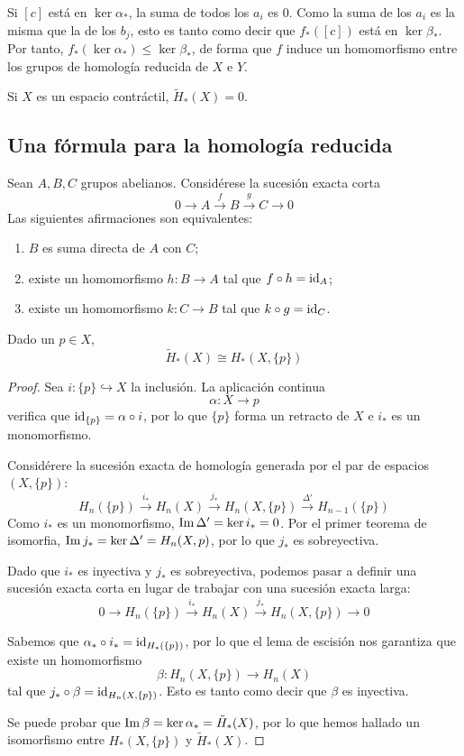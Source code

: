 Si $[c]$ está en $\ker \alpha_*$, la suma de todos los $a_i$ es 0. Como la
suma de los $a_i$ es la misma que la de los $b_j$, esto es tanto como decir
que $f_*([c])$ está en $\ker \beta_*$. Por tanto, $f_*(\ker \alpha_*) \leq
\ker \beta_*$, de forma que $f$ induce un homomorfismo entre los grupos de
homología reducida de $X$ e $Y$.

\begin{example}
Si $X$ es un espacio contráctil, $\tilde{H}_*(X)=0$.
\end{example}

\subsection{Una fórmula para la homología reducida}
\begin{lemma}
Sean $A,B,C$ grupos abelianos. Considérese la sucesión exacta corta
\[0 \longrightarrow A \xrightarrow{f} B \xrightarrow{g} C \longrightarrow 0\]
Las siguientes afirmaciones son equivalentes:
\begin{enumerate}
\item $B$ es suma directa de $A$ con $C$;
\item existe un homomorfismo $h\colon B \to A$ tal que $f\circ h=\operatorname{id}_A$;
\item existe un homomorfismo $k\colon C \to B$ tal que $k\circ g=\operatorname{id}_C$.
\end{enumerate}
\end{lemma}

\begin{proposition}
Dado un $p \in X$,
\[\tilde{H}_*(X)\cong H_*(X,\{p\})\]
\end{proposition}

\begin{proof}
Sea $i\colon \{p\} \hookrightarrow X$ la inclusión. La aplicación continua
\[\alpha: X \longrightarrow {p}\]
verifica que $\operatorname{id}_{\{p\}}=\alpha\circ i$, por lo que $\{p\}$ forma un
retracto de $X$ e $i_*$ es un monomorfismo.

Considérere la sucesión exacta de homología generada por el par de espacios
$(X,\{p\})$:
\[H_n(\{p\}) \xrightarrow{i_*} H_n(X) \xrightarrow{j_*}
H_n(X,\{p\}) \xrightarrow{\Delta'} H_{n-1}(\{p\})\]
Como $i_*$ es un monomorfismo, $\operatorname{Im} \Delta'=\ker i_*=0$. Por el primer teorema
de isomorfia, $\operatorname{Im} j_*=\ker \Delta'=H_n(X,p)$, por lo que $j_*$ es sobreyectiva.

Dado que $i_*$ es inyectiva y $j_*$ es sobreyectiva, podemos pasar a definir
una sucesión exacta corta en lugar de trabajar con una sucesión exacta
larga:
\[0 \longrightarrow H_n(\{p\}) \xrightarrow{i_*} H_n(X) \xrightarrow{j_*}
H_n(X,\{p\}) \longrightarrow 0\]

Sabemos que $\alpha_* \circ i_*=\operatorname{id}_{H_*(\{p\})}$, por lo que el lema de
escisión nos garantiza que existe un homomorfismo
\[\beta\colon H_n(X,\{p\}) \to H_n(X)\]
tal que $j_*\circ \beta=\operatorname{id}_{H_n(X,\{p\})}$. Esto es tanto como decir que
$\beta$ es inyectiva.

Se puede probar que $\operatorname{Im} \beta=\ker \alpha_*=\tilde{H}_*(X)$, por lo que
hemos hallado un isomorfismo entre $H_*(X,\{p\})$ y $\tilde{H}_*(X)$.
\end{proof}

